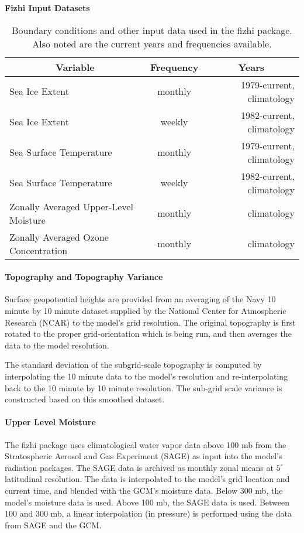\begin{table}[htb]
\begin{center}
{\bf Fizhi Input Datasets} \\
\vspace{0.1in}
\begin{tabular}{|l|c|r|} \hline
\multicolumn{1}{|c}{Variable} & \multicolumn{1}{|c}{Frequency} & \multicolumn{1}{|c|}{Years} \\ \hline\hline
Sea Ice Extent & monthly & 1979-current, climatology \\ \hline
Sea Ice Extent & weekly  & 1982-current, climatology \\ \hline
Sea Surface Temperature & monthly & 1979-current, climatology \\ \hline
Sea Surface Temperature & weekly & 1982-current, climatology \\ \hline
Zonally Averaged Upper-Level Moisture & monthly  & climatology \\ \hline
Zonally Averaged Ozone Concentration & monthly  & climatology \\ \hline
\end{tabular}
\end{center}
\caption{Boundary conditions and other input data used in the fizhi package.  Also noted are the
current years and frequencies available.}
\label{tab:fizhi:bcdata}
\end{table}


\paragraph{Topography and Topography Variance}

Surface geopotential heights are provided from an averaging of the Navy 10 minute
by 10 minute dataset supplied by the National Center for Atmospheric Research (NCAR) to the
model's grid resolution. The original topography is first rotated to the proper grid-orientation
which is being run, and then  averages the data to the model resolution.  

The standard deviation of the subgrid-scale topography is computed by interpolating the 10 minute 
data to the model's resolution and re-interpolating back to the 10 minute by 10 minute resolution. 
The sub-grid scale variance is constructed based on this smoothed dataset.


\paragraph{Upper Level Moisture}
The fizhi package uses climatological water vapor data above 100 mb from the Stratospheric Aerosol and Gas 
Experiment (SAGE) as input into the model's radiation packages.  The SAGE data is archived
as monthly zonal means at $5^\circ$ latitudinal resolution.  The data is interpolated to the
model's grid location and current time, and blended with the GCM's moisture data.  Below 300 mb,
the model's moisture data is used.  Above 100 mb, the SAGE data is used.  Between 100 and 300 mb,
a linear interpolation (in pressure) is performed using the data from SAGE and the GCM. 


